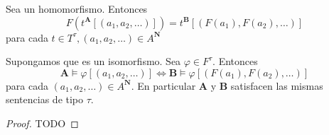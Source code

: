 \begin{lemma}
  Sea  un homomorfismo. Entonces
  $$
  F(t^\mathbf{A}[(a_1, a_2, \dots)]) = t^\mathbf{B}[(F(a_1), F(a_2), \dots)]
  $$
  para cada $t \in T^\tau, (a_1, a_2, \dots) \in A^\mathbf{N}$
\end{lemma}

\begin{lemma}
  Supongamos que  es un isomorfismo. Sea $\varphi \in F^\tau$. Entonces
  $$
  \mathbf{A}\models\varphi[(a_1, a_2, \dots)] \iff \mathbf{B}\models\varphi[(F(a_1), F(a_2),\dots)]
  $$
  para cada $(a_1, a_2, \dots) \in A^\mathbf{N}$. En particular $\mathbf{A}$ y $\mathbf{B}$ satisfacen las mismas
  sentencias de tipo $\tau$.
\end{lemma}
\begin{proof}
  TODO
\end{proof}

